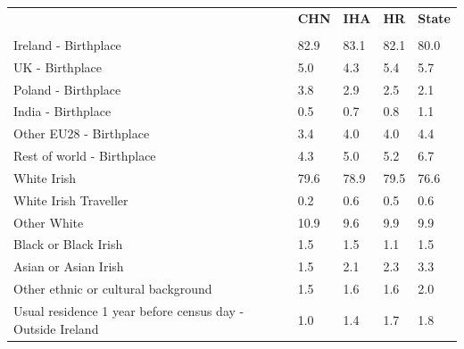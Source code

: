 \documentclass{article}
\begin{document}
\pagebreak
\begin{table}[h]	
\centering
		\begin{tabular}{KTTTT}
  \hline
& \textbf{CHN} & \textbf{IHA} & \textbf{HR}& \textbf{State}\\ 
  \hline
    \\ 
    \hline
Ireland - Birthplace & 82.9& 83.1& 82.1& 80.0\\
UK - Birthplace & 5.0& 4.3& 5.4& 5.7\\
Poland - Birthplace & 3.8& 2.9& 2.5& 2.1\\
India - Birthplace & 0.5& 0.7& 0.8& 1.1\\
Other EU28 - Birthplace & 3.4& 4.0& 4.0& 4.4\\
Rest of world - Birthplace & 4.3& 5.0& 5.2& 6.7\\
    \hline
White Irish & 79.6& 78.9& 79.5& 76.6\\
White Irish Traveller & 0.2& 0.6& 0.5& 0.6\\
Other White & 10.9&  9.6&  9.9&  9.9\\
Black or Black Irish & 1.5& 1.5& 1.1& 1.5\\
Asian or Asian Irish & 1.5& 2.1& 2.3& 3.3\\
Other ethnic or cultural background & 1.5& 1.6& 1.6& 2.0\\
    \hline
Usual residence 1 year before census day - Outside Ireland & 1.0& 1.4& 1.7& 1.8\\


\end{tabular}
\end{table}
\end{document}
